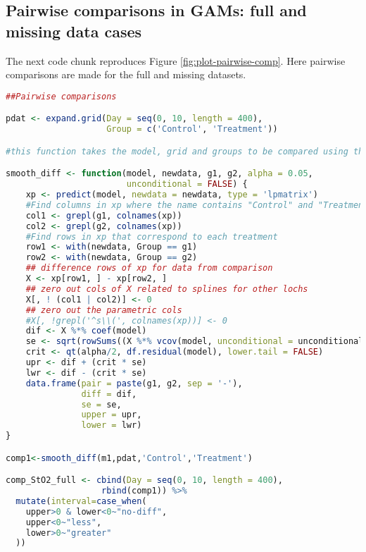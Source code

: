 \documentclass[
]{article}
\begin{document}
\hypertarget{pairwise-comparisons-in-gams-full-and-missing-data-cases}{%
\subsection{Pairwise comparisons in GAMs: full and missing data cases}\label{pairwise-comparisons-in-gams-full-and-missing-data-cases}}

The next code chunk reproduces Figure \ref{fig:plot-pairwise-comp}. Here pairwise comparisons are made for the full and missing datasets.

\begin{lstlisting}[language=R]
##Pairwise comparisons

pdat <- expand.grid(Day = seq(0, 10, length = 400),
                    Group = c('Control', 'Treatment'))

#this function takes the model, grid and groups to be compared using the lpmatrix

smooth_diff <- function(model, newdata, g1, g2, alpha = 0.05,
                        unconditional = FALSE) {
    xp <- predict(model, newdata = newdata, type = 'lpmatrix')
    #Find columns in xp where the name contains "Control" and "Treatment"
    col1 <- grepl(g1, colnames(xp))
    col2 <- grepl(g2, colnames(xp))
    #Find rows in xp that correspond to each treatment
    row1 <- with(newdata, Group == g1)
    row2 <- with(newdata, Group == g2)
    ## difference rows of xp for data from comparison
    X <- xp[row1, ] - xp[row2, ]
    ## zero out cols of X related to splines for other lochs
    X[, ! (col1 | col2)] <- 0
    ## zero out the parametric cols
    #X[, !grepl('^s\\(', colnames(xp))] <- 0
    dif <- X %*% coef(model)
    se <- sqrt(rowSums((X %*% vcov(model, unconditional = unconditional)) * X))
    crit <- qt(alpha/2, df.residual(model), lower.tail = FALSE)
    upr <- dif + (crit * se)
    lwr <- dif - (crit * se)
    data.frame(pair = paste(g1, g2, sep = '-'),
               diff = dif,
               se = se,
               upper = upr,
               lower = lwr)
}

comp1<-smooth_diff(m1,pdat,'Control','Treatment')

comp_StO2_full <- cbind(Day = seq(0, 10, length = 400),
                   rbind(comp1)) %>%
  mutate(interval=case_when(
    upper>0 & lower<0~"no-diff",
    upper<0~"less",
    lower>0~"greater"
  ))


\end{lstlisting}
\end{document}
